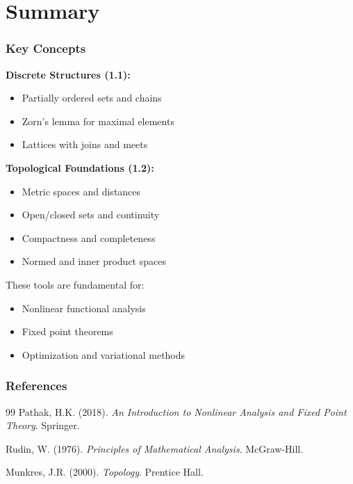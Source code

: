 \documentclass[aspectratio=169,10pt]{beamer}
\begin{document}
\section{Summary}

\begin{frame}
\frametitle{Key Concepts}

\textbf{Discrete Structures (1.1):}
\begin{itemize}
\item Partially ordered sets and chains
\item Zorn's lemma for maximal elements
\item Lattices with joins and meets
\end{itemize}

\vspace{0.3cm}

\textbf{Topological Foundations (1.2):}
\begin{itemize}
\item Metric spaces and distances
\item Open/closed sets and continuity
\item Compactness and completeness
\item Normed and inner product spaces
\end{itemize}

\vspace{0.3cm}

These tools are fundamental for:
\begin{itemize}
\item Nonlinear functional analysis
\item Fixed point theorems
\item Optimization and variational methods
\end{itemize}
\end{frame}

\begin{frame}
\frametitle{References}

\begin{thebibliography}{99}
Pathak, H.K. (2018). \textit{An Introduction to Nonlinear Analysis and Fixed Point Theory}. Springer.

Rudin, W. (1976). \textit{Principles of Mathematical Analysis}. McGraw-Hill.

Munkres, J.R. (2000). \textit{Topology}. Prentice Hall.
\end{thebibliography}
\end{frame}
\end{document}
